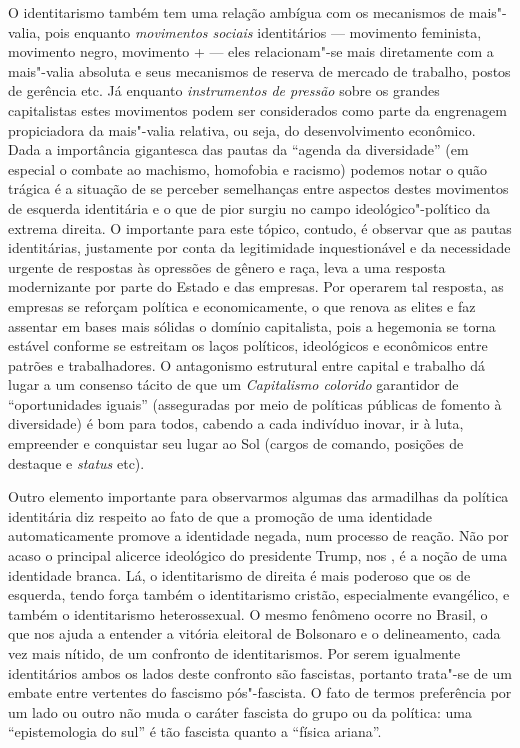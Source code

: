 O identitarismo também tem uma relação ambígua com os mecanismos de
mais"-valia, pois enquanto \emph{movimentos sociais} identitários ---
movimento feminista, movimento negro, movimento + --- eles
relacionam"-se mais diretamente com a mais"-valia absoluta e seus
mecanismos de reserva de mercado de trabalho, postos de gerência etc. Já
enquanto \emph{instrumentos de pressão} sobre os grandes capitalistas
estes movimentos podem ser considerados como parte da engrenagem
propiciadora da mais"-valia relativa, ou seja, do desenvolvimento
econômico. Dada a importância gigantesca das pautas da ``agenda da
diversidade'' (em especial o combate ao machismo, homofobia e racismo)
podemos notar o quão trágica é a situação de se perceber semelhanças
entre aspectos destes movimentos de esquerda identitária e o que de pior
surgiu no campo ideológico"-político da extrema direita. O importante
para este tópico, contudo, é observar que as pautas identitárias,
justamente por conta da legitimidade inquestionável e da necessidade
urgente de respostas às opressões de gênero e raça, leva a uma resposta
modernizante por parte do Estado e das empresas. Por operarem tal
resposta, as empresas se reforçam política e economicamente, o que
renova as elites e faz assentar em bases mais sólidas o domínio
capitalista, pois a hegemonia se torna estável conforme se estreitam os
laços políticos, ideológicos e econômicos entre patrões e trabalhadores.
O antagonismo estrutural entre capital e trabalho dá lugar a um consenso
tácito de que um \emph{Capitalismo colorido} garantidor de
``oportunidades iguais'' (asseguradas por meio de políticas públicas de
fomento à diversidade) é bom para todos, cabendo a cada indivíduo
inovar, ir à luta, empreender e conquistar seu lugar ao Sol (cargos de
comando, posições de destaque e \emph{status} etc).

Outro elemento importante para observarmos algumas das armadilhas da
política identitária diz respeito ao fato de que a promoção de uma
identidade automaticamente promove a identidade negada, num processo de
reação. Não por acaso o principal alicerce ideológico do presidente
Trump, nos , é a noção de uma identidade branca. Lá, o identitarismo
de direita é mais poderoso que os de esquerda, tendo força também o
identitarismo cristão, especialmente evangélico, e também o
identitarismo heterossexual. O mesmo fenômeno ocorre no Brasil, o que
nos ajuda a entender a vitória eleitoral de Bolsonaro e o delineamento,
cada vez mais nítido, de um confronto de identitarismos. Por serem
igualmente identitários ambos os lados deste confronto são fascistas,
portanto trata"-se de um embate entre vertentes do fascismo pós"-fascista.
O fato de termos preferência por um lado ou outro não muda o caráter
fascista do grupo ou da política: uma ``epistemologia do sul'' é tão
fascista quanto a ``física ariana''.

